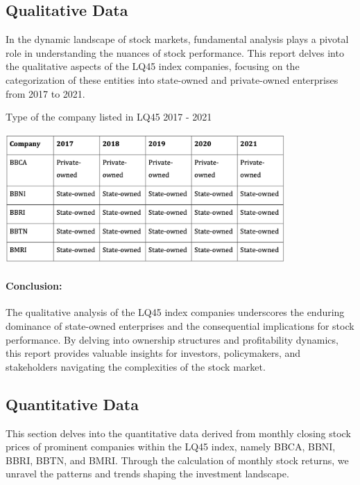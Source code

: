 

\subsection{Qualitative Data}
\par
In the dynamic landscape of stock markets, fundamental analysis plays a pivotal role in understanding the nuances of stock performance. This report delves into the qualitative aspects of the LQ45 index companies, focusing on the categorization of these entities into state-owned and private-owned enterprises from 2017 to 2021.

\begin{table}[H]
    \centering
    
    \caption{Type of the company listed in LQ45 2017 - 2021}
    
    \centering
    \includegraphics[width = 0.8\textwidth]{figures/table_1.png}
    \label{tab:}
\end{table}

\paragraph{Conclusion:}
\par The qualitative analysis of the LQ45 index companies underscores the enduring dominance of state-owned enterprises and the consequential implications for stock performance. By delving into ownership structures and profitability dynamics, this report provides valuable insights for investors, policymakers, and stakeholders navigating the complexities of the stock market.

\subsection{Quantitative Data}

This section delves into the quantitative data derived from monthly closing stock prices of prominent companies within the LQ45 index, namely BBCA, BBNI, BBRI, BBTN, and BMRI. Through the calculation of monthly stock returns, we unravel the patterns and trends shaping the investment landscape.

